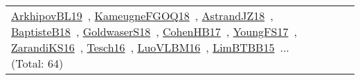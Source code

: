 {\begin{longtable}{lp{3cm}>{\raggedright\arraybackslash}p{6cm}>{\raggedright\arraybackslash}p{6cm}>{\raggedright\arraybackslash}p{8cm}}
\href{works/ArkhipovBL19.pdf}{ArkhipovBL19}~\cite{ArkhipovBL19}, \href{works/KameugneFGOQ18.pdf}{KameugneFGOQ18}~\cite{KameugneFGOQ18}, \href{works/AstrandJZ18.pdf}{AstrandJZ18}~\cite{AstrandJZ18}, \href{works/BaptisteB18.pdf}{BaptisteB18}~\cite{BaptisteB18}, \href{works/GoldwaserS18.pdf}{GoldwaserS18}~\cite{GoldwaserS18}, \href{works/CohenHB17.pdf}{CohenHB17}~\cite{CohenHB17}, \href{works/YoungFS17.pdf}{YoungFS17}~\cite{YoungFS17}, \href{works/ZarandiKS16.pdf}{ZarandiKS16}~\cite{ZarandiKS16}, \href{works/Tesch16.pdf}{Tesch16}~\cite{Tesch16}, \href{works/LuoVLBM16.pdf}{LuoVLBM16}~\cite{LuoVLBM16}, \href{works/LimBTBB15.pdf}{LimBTBB15}~\cite{LimBTBB15}... (Total: 64)\\
\end{longtable}
}

